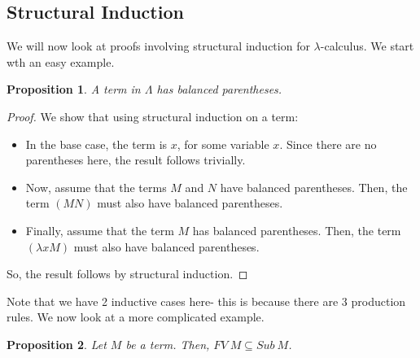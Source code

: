 \documentclass[a4paper, openany]{memoir}
\newtheorem{proposition}{Proposition}[section]
\theoremstyle{definition}
\begin{document}
    \subsection{Structural Induction}
    We will now look at proofs involving structural induction for $\lambda$-calculus. We start wth an easy example.
    \begin{proposition}
        A term in $\Lambda$ has balanced parentheses.
    \end{proposition}
    \begin{proof}
        We show that using structural induction on a term:
        \begin{itemize}
            \item In the base case, the term is $x$, for some variable $x$. Since there are no parentheses here, the result follows trivially.
            \item Now, assume that the terms $M$ and $N$ have balanced parentheses. Then, the term $(MN)$ must also have balanced parentheses.
            \item Finally, assume that the term $M$ has balanced parentheses. Then, the term $(\lambda x M)$ must also have balanced parentheses.
        \end{itemize}
        So, the result follows by structural induction.
    \end{proof}
    \noindent Note that we have 2 inductive cases here- this is because there are 3 production rules. We now look at a more complicated example.
    \begin{proposition}
        Let $M$ be a term. Then, $FV \ M \subseteq Sub \ M$.
    \end{proposition}
\end{document}
